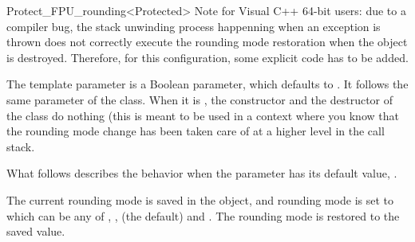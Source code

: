 \begin{ccRefClass}{Protect_FPU_rounding<Protected>}
Note for Visual C++ 64-bit users: due to a compiler bug, the stack unwinding
process happenning when an exception is thrown does not correctly execute the
rounding mode restoration when the  object is
destroyed.  Therefore, for this configuration, some explicit code has to be
added.


\ccParameters

The template parameter  is a Boolean parameter, which defaults
to .  It follows the same parameter of the  class.
When it is , the constructor and the destructor of the class do
nothing (this is meant to be used in a context where you know that the rounding
mode change has been taken care of at a higher level in the call stack.

What follows describes the behavior when the parameter has its default value,
.

\ccCreation

{The current rounding mode is saved in the object, and rounding mode is set to 
which can be any of , ,
 (the default) and .}
\ccGlue
{}
{The rounding mode is restored to the saved value.}

\end{ccRefClass}
